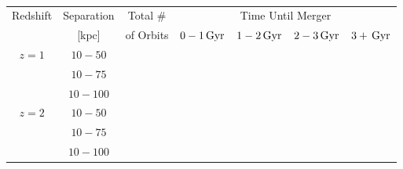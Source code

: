 \begin{table*}[]
\centering
\begin{tabular}{c|c|c|c|c|c|c}
\hline \hline
\multirow{2}{*}{Redshift} & Separation & Total \# & \multicolumn{4}{c}{Time Until Merger} \\ \cline{4-7}
 & [kpc] &  of Orbits & $0-1\,\mathrm{Gyr}$ & $1-2\,\mathrm{Gyr}$ & $2-3\,\mathrm{Gyr}$ & $3+\,\mathrm{Gyr}$  \\ \hline
\multirow{3}{*}{$z=1$} & $10-50$ &  &  &  &  &   \\
 & $10-75$ &  &  &  &  &   \\
 & $10-100$ &  &  &  &  &   \\
  \hline 
 \multirow{3}{*}{$z=2$} & $10-50$ &  &  &  &  &    \\
 & $10-75$ &  &  &  &  & \\
 & $10-100$ &  &  &  &  &   \\
 \hline \hline
\end{tabular}
\caption{}
\label{tab:timevssepvsz}
\end{table*}